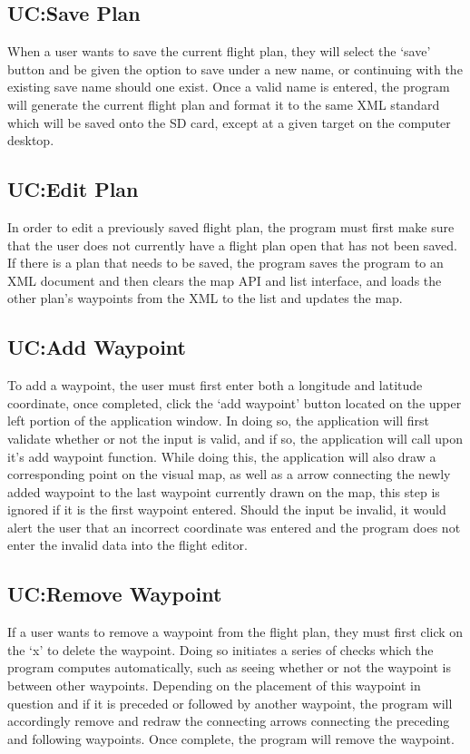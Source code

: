 \documentclass[12pt, letterpaper]{article}
\begin{document}
\clearpage
\subsection{UC:Save Plan} \label{saveplan}
When a user wants to save the current flight plan, they will select the `save' button and be given the option to save under a new name, or continuing with the existing save name should one exist.
Once a valid name is entered, the program will generate the current flight plan and format it to the same XML standard which will be saved onto the SD card, except at a given target on the computer desktop.

\clearpage
\subsection{UC:Edit Plan} \label{editplan}
In order to edit a previously saved flight plan, the program must first make sure that the user does not currently have a flight plan open that has not been saved.
If there is a plan that needs to be saved, the program saves the program to an XML document and then clears the map API and list interface, and loads the other plan’s waypoints from the XML to the list and updates the map.

\clearpage
\subsection{UC:Add Waypoint}\label{sec:addwp}
To add a waypoint, the user must first enter both a longitude and latitude coordinate, once completed, click the `add waypoint' button located on the upper left portion of the application window.
In doing so, the application will first validate whether or not the input is valid, and if so, the application will call upon it's add waypoint function.
While doing this, the application will also draw a corresponding point on the visual map, as well as a arrow connecting the newly added waypoint to the last waypoint currently drawn on the map, this step is ignored if it is the first waypoint entered.
Should the input be invalid, it would alert the user that an incorrect coordinate was entered and the program does not enter the invalid data into the flight editor.

\clearpage
\subsection{UC:Remove Waypoint}\label{sec:rmwp}
If a user wants to remove a waypoint from the flight plan, they must first click on the `x' to delete the waypoint.
Doing so initiates a series of checks which the program computes automatically, such as seeing whether or not the waypoint is between other waypoints.
Depending on the placement of this waypoint in question and if it is preceded or followed by another waypoint, the program will accordingly remove and redraw the connecting arrows connecting the preceding and following waypoints.
Once complete, the program will remove the waypoint.
\end{document}

